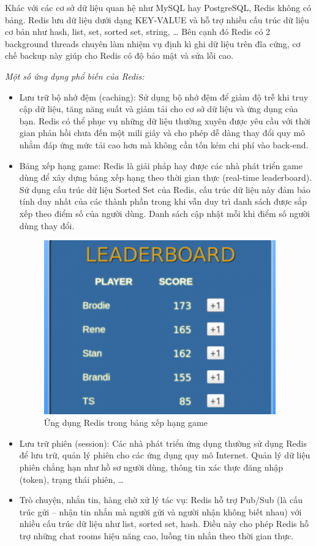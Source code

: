 Khác với các cơ sở dữ liệu quan hệ như MySQL hay PostgreSQL,
Redis không có bảng. Redis lưu dữ liệu dưới dạng KEY-VALUE và hỗ
trợ nhiều cấu trúc dữ liệu cơ bản như hash, list, set,
sorted set, string, … Bên cạnh đó Redis có 2 background threads chuyên
làm nhiệm vụ định kì ghi dữ liệu trên đĩa cứng, cơ chế backup
này giúp cho Redis có độ bảo mật và sửa lỗi cao.

\textit{Một số ứng dụng phổ biến của Redis:}
\begin{itemize}[topsep=0ex]
\item Lưu trữ bộ nhớ đệm (caching): Sử dụng bộ nhớ đệm để giảm độ trễ
    khi truy cập dữ liệu, tăng năng suất và giảm tải cho cơ sở dữ
    liệu và ứng dụng của bạn. Redis có thể phục vụ những dữ liệu thường
    xuyên được yêu cầu với thời gian phản hồi chưa đến một mili giây
    và cho phép dễ dàng thay đổi quy mô nhằm đáp ứng mức tải cao hơn
    mà không cần tốn kém chi phí vào back-end.

\item Bảng xếp hạng game: Redis là giải pháp hay được các nhà phát
    triển game dùng để xây dựng bảng xếp hạng theo thời gian thực
    (real-time leaderboard). Sử dụng cấu trúc dữ liệu Sorted Set của
    Redis, cấu trúc dữ liệu này đảm bảo tính duy nhất của các thành
    phần trong khi vẫn duy trì danh sách được sắp xếp theo điểm số
    của người dùng. Danh sách cập nhật mỗi khi điểm số người dùng thay đổi.

\begin{figure}[H]
    \centering
    \includegraphics[width=10cm]{images/real-time-leader-board.png}
    \caption{Ứng dụng Redis trong bảng xếp hạng game}
\end{figure}

\item Lưu trữ phiên (session): Các nhà phát triển ứng dụng thường sử
    dụng Redis để lưu trữ, quản lý phiên cho các ứng dụng quy mô
    Internet. Quản lý dữ liệu phiên chẳng hạn như hồ sơ người dùng,
    thông tin xác thực đăng nhập (token), trạng thái phiên, …

\item Trò chuyện, nhắn tin, hàng chờ xử lý tác vụ: Redis hỗ trợ Pub/Sub
    (là cấu trúc gửi – nhận tin nhắn mà người gửi và người nhận không
    biết nhau) với nhiều cấu trúc dữ liệu như list, sorted set, hash.
    Điều này cho phép Redis hỗ trợ những chat rooms hiệu năng cao,
    luồng tin nhắn theo thời gian thực.
\end{itemize}

